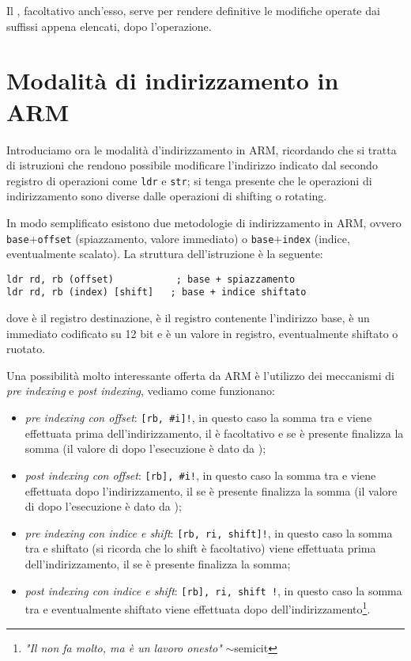 \documentclass[class=book, crop=false, oneside]{standalone}
\begin{document}
Il \suffix{!}, facoltativo anch'esso, serve per rendere definitive le modifiche operate dai suffissi appena elencati, dopo l'operazione.

\section{Modalità di indirizzamento in ARM}
Introduciamo ora le modalità d'indirizzamento in ARM, ricordando che si tratta di istruzioni che rendono possibile modificare l'indirizzo indicato dal secondo registro di operazioni come \texttt{ldr} e \texttt{str}; si tenga presente che le operazioni di indirizzamento sono diverse dalle operazioni di shifting o rotating.

In modo semplificato esistono due metodologie di indirizzamento in ARM, ovvero \texttt{base}\(+\)\texttt{offset} (spiazzamento, valore immediato) o \texttt{base}\(+\)\texttt{index} (indice, eventualmente scalato). La struttura dell'istruzione è la seguente:

\begin{verbatim}
ldr rd, rb (offset)           ; base + spiazzamento
ldr rd, rb (index) [shift]   ; base + indice shiftato
\end{verbatim}
dove  è il registro destinazione,  è il registro contenente l'indirizzo base,  è un immediato codificato su 12 bit e  è un valore in registro, eventualmente shiftato o ruotato.

Una possibilità molto interessante offerta da ARM è l'utilizzo dei meccanismi di \emph{pre indexing} e \emph{post indexing}, vediamo come funzionano:

\begin{itemize}
	\item \emph{pre indexing con offset}: \texttt{[rb, \#i]!}, in questo caso la somma tra  e  viene  effettuata prima dell'indirizzamento, il \register{!} è facoltativo e se è presente finalizza la somma (il valore di  dopo l'esecuzione è dato da );
	\item \emph{post indexing con offset}: \texttt{[rb], \#i!}, in questo caso la somma tra  e  viene effettuata dopo l'indirizzamento, il \suffix{!} se è presente finalizza la somma (il valore di  dopo l'esecuzione è dato da );
	\item \emph{pre indexing con indice e shift}: \texttt{[rb, ri, shift]!}, in questo caso la somma tra  e  shiftato (si ricorda che lo shift è facoltativo) viene  effettuata prima dell'indirizzamento, il \suffix{!} se è presente finalizza la somma;
	\item \emph{post indexing con indice e shift}: \texttt{[rb], ri, shift !}, in questo caso la somma tra  e  eventualmente shiftato viene effettuata dopo dell'indirizzamento\footnote{\emph{"Il \suffix{!} non fa molto, ma è un lavoro onesto"} \(\sim\)semicit}.
\end{itemize}
\end{document}
